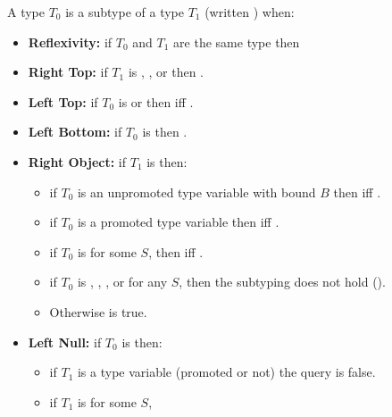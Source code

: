 \documentclass[makeidx]{article}
\begin{document}
\LMHash{}%
A type $T_0$ is a subtype of a type $T_1$ (written ) when:

\begin{itemize}
\item
  \textbf{Reflexivity:}
  if $T_0$ and $T_1$ are the same type then 

\item
  \textbf{Right Top:}
  if $T_1$ is \DYNAMIC, \VOID, or  then .
\item
  \textbf{Left Top:}
  if $T_0$ is \DYNAMIC{} or \VOID{}
  then  if{}f .
\item
  \textbf{Left Bottom:}
  if $T_0$ is  then .
\item
  \textbf{Right Object:}
  if $T_1$ is  then:
  \begin{itemize}
  \item
    if $T_0$ is an unpromoted type variable with bound $B$
    then  if{}f .
  \item
    if $T_0$ is a promoted type variable 
    then  if{}f .
  \item
    if $T_0$ is  for some $S$,
    then  if{}f .
  \item
    if $T_0$ is , \DYNAMIC, \VOID, or  for any $S$,
    then the subtyping does not hold
    ().
  \item
    Otherwise  is true.
  \end{itemize}
\item
  \textbf{Left Null:}
  if $T_0$ is  then:
  \begin{itemize}
  \item
    if $T_1$ is a type variable (promoted or not) the query is false.
  \item
    if $T_1$ is  for some $S$,

\end{itemize}
\end{itemize}
\end{document}
